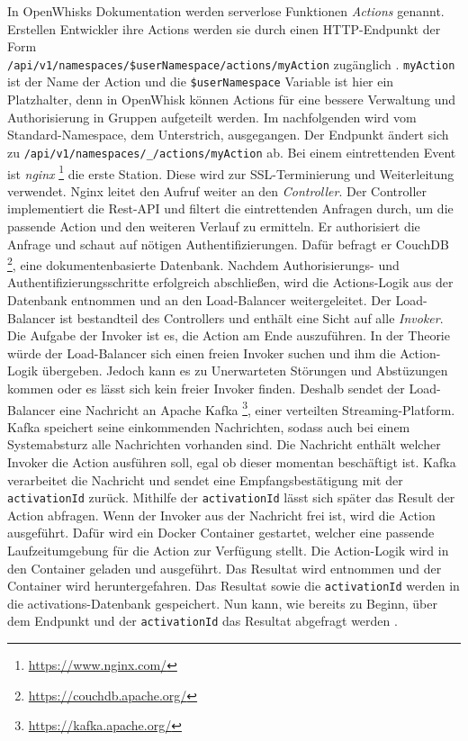In OpenWhisks Dokumentation werden serverlose Funktionen
\textit{Actions} genannt. Erstellen Entwickler ihre
Actions werden sie durch einen HTTP-Endpunkt der Form\\
\texttt{/api/v1/namespaces/\$userNamespace/actions/myAction} zugänglich
\cite{OpenWhiskGithub}. \texttt{myAction} ist der Name der Action
und die \texttt{\$userNamespace} Variable ist hier ein
Platzhalter, denn in OpenWhisk können Actions für eine bessere
Verwaltung und Authorisierung in Gruppen aufgeteilt werden.
Im nachfolgenden wird vom Standard-Namespace, dem Unterstrich,
ausgegangen. Der Endpunkt ändert sich zu
\texttt{/api/v1/namespaces/\_/actions/myAction} ab.
Bei einem eintrettenden Event ist \textit{nginx}
\footnote{\url{https://www.nginx.com/}} die erste Station.
Diese wird zur SSL-Terminierung und Weiterleitung verwendet.
Nginx leitet den Aufruf weiter an den \textit{Controller}.
Der Controller implementiert die Rest-API und filtert die
eintrettenden Anfragen durch, um die passende Action und
den weiteren Verlauf zu ermitteln.
Er authorisiert die Anfrage und schaut auf nötigen Authentifizierungen.
Dafür befragt er CouchDB \footnote{\url{https://couchdb.apache.org/}},
eine dokumentenbasierte Datenbank. Nachdem Authorisierungs-
und Authentifizierungsschritte erfolgreich abschließen,
wird die Actions-Logik aus der Datenbank entnommen und an den
Load-Balancer weitergeleitet. Der Load-Balancer ist bestandteil
des Controllers und enthält eine Sicht auf alle \textit{Invoker}.
Die Aufgabe der Invoker ist es, die Action am Ende auszuführen.
In der Theorie würde der Load-Balancer sich einen freien Invoker suchen
und ihm die Action-Logik übergeben. Jedoch kann es zu Unerwarteten
Störungen und Abstüzungen kommen oder es lässt sich kein freier
Invoker finden. Deshalb sendet der Load-Balancer eine Nachricht an
Apache Kafka \footnote{\url{https://kafka.apache.org/}},
einer verteilten Streaming-Platform. Kafka speichert seine
einkommenden Nachrichten, sodass auch bei einem Systemabsturz alle
Nachrichten vorhanden sind. Die Nachricht enthält welcher
Invoker die Action ausführen soll, egal ob dieser momentan
beschäftigt ist. Kafka verarbeitet die Nachricht und sendet eine
Empfangsbestätigung mit der \texttt{activationId} zurück. Mithilfe
der \texttt{activationId} lässt sich später das Result der Action
abfragen. Wenn der Invoker aus der Nachricht frei ist, wird die
Action ausgeführt. Dafür wird ein Docker Container gestartet,
welcher eine passende Laufzeitumgebung für die Action zur Verfügung
stellt. Die Action-Logik wird in den Container geladen und ausgeführt.
Das Resultat wird entnommen und der Container wird heruntergefahren.
Das Resultat sowie die \texttt{activationId} werden in die
activations-Datenbank gespeichert. Nun kann, wie bereits zu Beginn,
über dem Endpunkt und der \texttt{activationId} das Resultat abgefragt
werden \cite{OpenWhiskGithub}.

